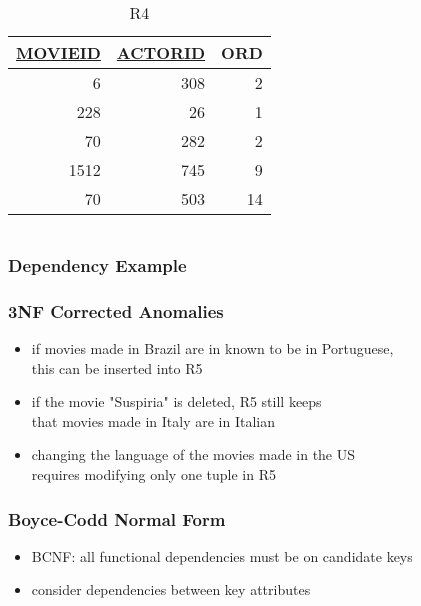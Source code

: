 \documentclass[dvipsnames]{beamer}
\begin{document}
\begin{frame}[label=example_db_3]
\begin{columns}[t]
    \begin{footnotesize}
    \begin{table}
      \caption{R4}
      \begin{tabular}{|r|r|r|}\hline
\underline{MOVIEID} & \underline{ACTORID} & ORD\\[2pt]\hline\hline
   6 & 308 &  2\\\hline
 228 &  26 &  1\\\hline
  70 & 282 &  2\\\hline
1512 & 745 &  9\\\hline
  70 & 503 & 14\\\hline
      \end{tabular}
    \end{table}
    \end{footnotesize}
  \end{columns}
\end{frame}

\begin{frame}
  \frametitle{Dependency Example}

  \begin{center}
  \end{center}
 \end{frame}

\begin{frame}
  \frametitle{3NF Corrected Anomalies}

  \hyperlink{example_db_3}{}

  \begin{itemize}
    \item if movies made in Brazil are in known to be in Portuguese,\\
      this can be inserted into R5

    \pause
    \medskip
    \item if the movie "Suspiria" is deleted, R5 still keeps\\
      that movies made in Italy are in Italian

    \pause
    \medskip
    \item changing the language of the movies made in the US\\
      requires modifying only one tuple in R5
  \end{itemize}
\end{frame}

\begin{frame}
  \frametitle{Boyce-Codd Normal Form}

  \begin{itemize}
    \item \alert{BCNF}: all functional dependencies must be on candidate keys
    \item consider dependencies between key attributes
  \end{itemize}
\end{frame}
\end{document}
